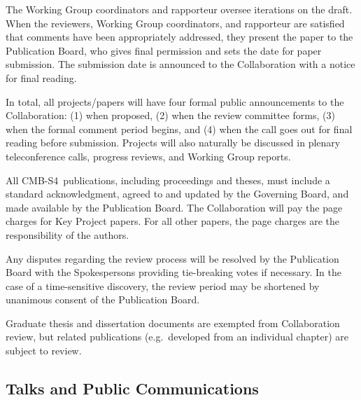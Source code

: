 \documentclass[12pt]{article}
\newcommand{\Comment}[1]{\textcolor{Blue}{(Comment: #1)}}
\newcommand\collabname{CMB-S4}
\begin{document}
The Working Group coordinators and rapporteur oversee iterations on the draft.  When the reviewers, Working Group coordinators, and rapporteur are satisfied that comments have been appropriately addressed, they present the paper to the Publication Board, who gives final permission and sets the date for paper submission.  The submission date is announced to the Collaboration with a notice for final reading.  

In total, all projects/papers will have four formal public announcements to the Collaboration:
(1) when proposed,
(2) when the review committee forms,
(3) when the formal comment period begins, and
(4) when the call goes out for final reading before submission.
  Projects will also naturally be discussed in plenary teleconference calls, progress reviews, and Working Group reports.

All \collabname\ publications, including proceedings and theses, must include a standard acknowledgment, agreed to and updated by the Governing Board, and made available by the Publication Board.  The Collaboration will pay the page charges for Key Project papers. For all other papers, the page charges are the responsibility of the authors.

Any disputes regarding the review process will be resolved by the Publication Board with the Spokespersons providing tie-breaking votes if necessary. In the case of a time-sensitive discovery, the review period may be shortened by unanimous consent of the Publication Board.

Graduate thesis and dissertation documents are exempted from Collaboration review, but related publications (e.g.~developed from an individual chapter) are subject to review.

\subsection{Talks and Public Communications}
\end{document}
